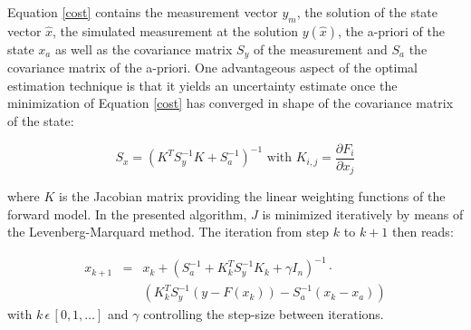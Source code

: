 \documentclass[amt]{style/copernicus}
\begin{document}
Equation \ref{cost} contains the measurement vector $y_m$, the solution of the state vector $\hat{x}$, the simulated measurement at the solution $y(\hat{x})$, the a-priori of the state $x_a$ as well as the covariance matrix $S_y$ of the measurement and $S_a$ the covariance matrix of the a-priori. One advantageous aspect of the optimal estimation technique is that it yields an uncertainty estimate once the minimization of Equation \ref{cost} has converged in shape of the covariance matrix of the state:

\begin{equation}
S_x=(K^TS_y^{-1}K+S_a^{-1})^{-1}  \mbox{ with } K_{i,j}=\frac{\partial F_i}{\partial x_j}
\end{equation}

where $K$ is the Jacobian matrix providing the linear weighting functions of the forward model. In the presented algorithm, $J$ is minimized iteratively by means of the Levenberg-Marquard method. The iteration from step $k$ to $k+1$  then reads:

\begin{eqnarray}\label{iteration}
x_{k+1} & = & x_k+(S_a^{-1}+K_k^TS_y^{-1}K_k+\gamma I_n)^{-1}\cdot\\\nonumber
         & & (K_k^TS_y^{-1}(y-F(x_k))-S_a^{-1}(x_k-x_a))
\end{eqnarray}
with $k\,\epsilon\, [0,1,\dots]$ and $\gamma$ controlling the step-size between iterations.
\end{document}
